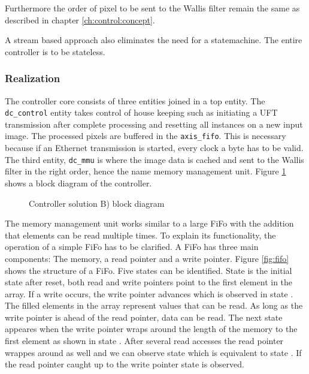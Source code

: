 Furthermore the order of pixel to be sent to the Wallis filter remain the same
as described in chapter \ref{ch:control:concept}. 

A stream based approach also eliminates the need for a statemachine. The entire
controller is to be stateless.

\subsubsection*{Realization}
The controller core consists of three entities joined in a top entity. The 
\texttt{dc\_control} entity takes control of house keeping such as initiating a
UFT transmission after complete processing and resetting all instances on a new
input image. The processed pixels are buffered in the \texttt{axis\_fifo}. This
is necessary because if an Ethernet transmission is started, every clock a byte
has to be valid. The third entity, \texttt{dc\_mmu} is where the image data is
cached and sent to the Wallis filter in the right order, hence the name memory
management unit. Figure \ref{fig:dctop} shows a block diagram of the controller.

\begin{figure}[b!]
    \centering
    \begin{adjustbox}{max width=1\textwidth}
        
    \end{adjustbox}
    \caption{Controller solution B) block diagram}
    \label{fig:dctop}
\end{figure}

The memory management unit works similar to a large FiFo with the addition that
elements can be read multiple times. To explain its functionality, the operation
of a simple FiFo has to be clarified. A FiFo has three main components: The
memory, a read pointer and a write pointer. Figure \ref{fig:fifo} shows the
structure of a FiFo. Five states can be identified. State  is the initial
state after reset, both read and write pointers point to the first element in
the array. If a write occurs, the write pointer advances which is observed in
state . The filled elements in the array represent values that can be
read. As long as the write pointer is ahead of the read pointer, data can be
read. The next state appeares when the write pointer wraps around the length of
the memory to the first element as shown in state . After several read
accesses the read pointer wrappes around as well and we can observe state 
 which is equivalent to state . If the read pointer caught up to
the write pointer state  is observed.

